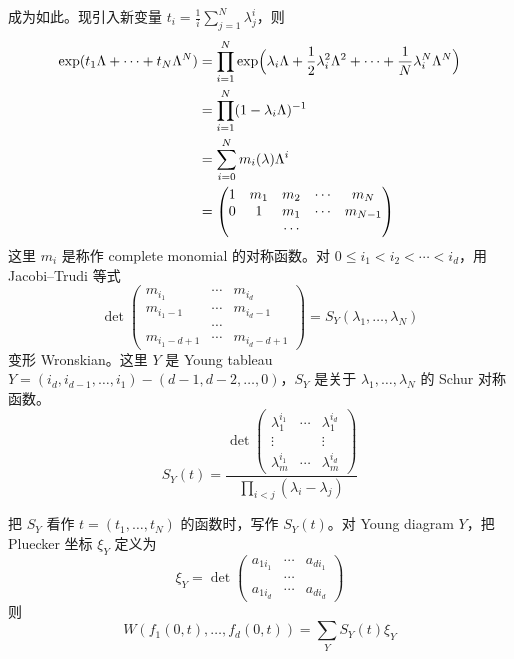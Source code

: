 
成为如此。现引入新变量 $t_i=\frac{1}{i}\sum_{j=1}^N\lambda_j^i$，则
\[
\begin{aligned}
\exp(t_1\Lambda+\cdots+t_N\Lambda^N)
&=\prod_{i=1}^N\exp\Bigl(\lambda_i\Lambda+\frac{1}{2}\lambda_i^2\Lambda^2+\cdots+\frac{1}{N}\lambda_i^N\Lambda^N\Bigr)\\
&=\prod_{i=1}^N(1-\lambda_i\Lambda)^{-1}\\
&=\sum_{i=0}^N m_i(\lambda)\Lambda^i\\
&=
\begin{pmatrix}
1 & m_1 & m_2 & \cdots & m_N\\
0 & 1 & m_1 & \cdots & m_{N-1}\\
 & & \cdots & &
\end{pmatrix}
\end{aligned}
\]
这里 $m_i$ 是称作 complete monomial 的对称函数。对 $0\le i_1<i_2<\cdots<i_d$，用 Jacobi–Trudi 等式
\[
\det
\begin{pmatrix}
m_{i_1} & \cdots & m_{i_d}\\
m_{i_1-1} & \cdots & m_{i_d-1}\\
 & \cdots & \\
m_{i_1-d+1} & \cdots & m_{i_d-d+1}
\end{pmatrix}
=S_Y(\lambda_1,\dots,\lambda_N)
\]
变形 Wronskian。这里 $Y$ 是 Young tableau $Y=(i_d,i_{d-1},\dots,i_1)-(d-1,d-2,\dots,0)$，$S_Y$ 是关于 $\lambda_1,\dots,\lambda_N$ 的 Schur 对称函数。
\[
S_Y(t)=\frac{\det
\begin{pmatrix}
\lambda_1^{i_1} & \cdots & \lambda_1^{i_d}\\
\vdots & & \vdots\\
\lambda_m^{i_1} & \cdots & \lambda_m^{i_d}
\end{pmatrix}}{\prod_{i<j}(\lambda_i-\lambda_j)}
\]

把 $S_Y$ 看作 $t=(t_1,\dots,t_N)$ 的函数时，写作 $S_Y(t)$。对 Young diagram $Y$，把 Pluecker 坐标 $\xi_Y$ 定义为
\[
\xi_Y=\det
\begin{pmatrix}
a_{1i_1} & \cdots & a_{di_1}\\
 & \cdots & \\
a_{1i_d} & \cdots & a_{di_d}
\end{pmatrix}
\]
则
\[
W(f_1(0,t),\dots,f_d(0,t))=\sum_Y S_Y(t)\xi_Y
\]


